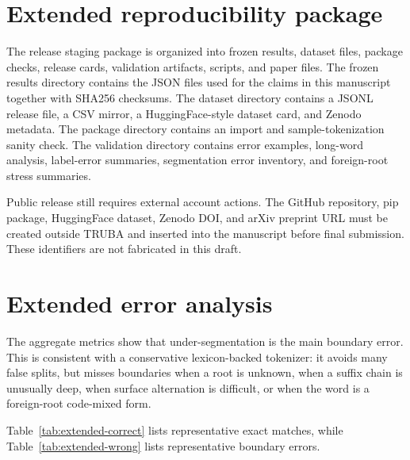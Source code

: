 \documentclass[11pt]{article}
\begin{document}
\section{Extended reproducibility package}
The release staging package is organized into frozen results, dataset files, package checks, release cards, validation artifacts, scripts, and paper files. The frozen results directory contains the JSON files used for the claims in this manuscript together with SHA256 checksums. The dataset directory contains a JSONL release file, a CSV mirror, a HuggingFace-style dataset card, and Zenodo metadata. The package directory contains an import and sample-tokenization sanity check. The validation directory contains error examples, long-word analysis, label-error summaries, segmentation error inventory, and foreign-root stress summaries.

Public release still requires external account actions. The GitHub repository, pip package, HuggingFace dataset, Zenodo DOI, and arXiv preprint URL must be created outside TRUBA and inserted into the manuscript before final submission. These identifiers are not fabricated in this draft.

\section{Extended error analysis}
The aggregate metrics show that under-segmentation is the main boundary error. This is consistent with a conservative lexicon-backed tokenizer: it avoids many false splits, but misses boundaries when a root is unknown, when a suffix chain is unusually deep, when surface alternation is difficult, or when the word is a foreign-root code-mixed form.

Table~\ref{tab:extended-correct} lists representative exact matches, while Table~\ref{tab:extended-wrong} lists representative boundary errors.
\end{document}
